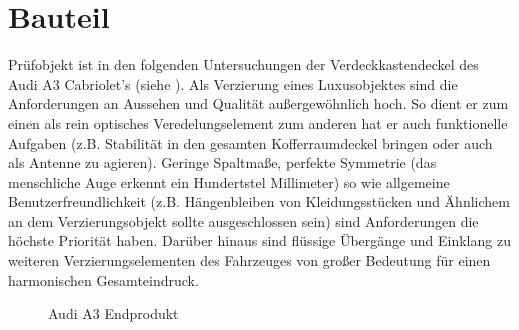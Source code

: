 \documentclass[12pt,a4paper,parskip]{scrartcl}
\begin{document}
  
\newpage
\section{Bauteil}
Prüfobjekt ist in den folgenden Untersuchungen der Verdeckkastendeckel  des Audi A3 Cabriolet's (siehe ).
 Als Verzierung eines Luxusobjektes sind die Anforderungen an Aussehen und Qualität außergewöhnlich hoch. So dient er zum einen als rein optisches Veredelungselement zum anderen hat er auch funktionelle Aufgaben (z.B. Stabilität in den gesamten Kofferraumdeckel bringen oder auch als Antenne zu agieren). Geringe Spaltmaße,  perfekte Symmetrie (das menschliche Auge erkennt ein Hundertstel Millimeter) so wie allgemeine Benutzerfreundlichkeit (z.B. Hängenbleiben von Kleidungsstücken und Ähnlichem an dem Verzierungsobjekt sollte ausgeschlossen sein) sind Anforderungen die höchste Priorität haben.
 Darüber hinaus sind  flüssige Übergänge und Einklang   zu weiteren Verzierungselementen des Fahrzeuges von großer Bedeutung für einen harmonischen Gesamteindruck.
 
   
\begin{figure}[hbtp]
\centering
\hfill
{}
\hfill
{}
\hfill
\caption[Audi A3 Endprodukt]{Audi A3 Endprodukt\footnotemark }
\label{fig:audia3}
\end{figure}
\end{document}
